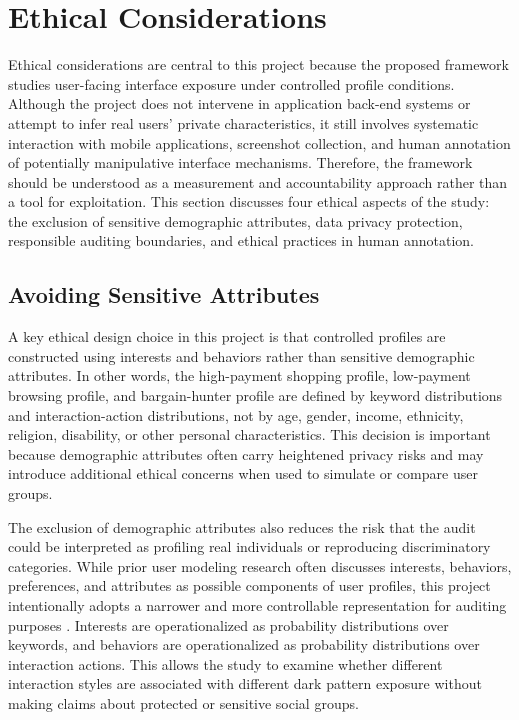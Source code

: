 \chapter{Ethical Considerations}

Ethical considerations are central to this project because the proposed framework studies user-facing interface exposure under controlled profile conditions. Although the project does not intervene in application back-end systems or attempt to infer real users' private characteristics, it still involves systematic interaction with mobile applications, screenshot collection, and human annotation of potentially manipulative interface mechanisms. Therefore, the framework should be understood as a measurement and accountability approach rather than a tool for exploitation. This section discusses four ethical aspects of the study: the exclusion of sensitive demographic attributes, data privacy protection, responsible auditing boundaries, and ethical practices in human annotation.

\section{Avoiding Sensitive Attributes}

A key ethical design choice in this project is that controlled profiles are constructed using interests and behaviors rather than sensitive demographic attributes. In other words, the high-payment shopping profile, low-payment browsing profile, and bargain-hunter profile are defined by keyword distributions and interaction-action distributions, not by age, gender, income, ethnicity, religion, disability, or other personal characteristics. This decision is important because demographic attributes often carry heightened privacy risks and may introduce additional ethical concerns when used to simulate or compare user groups.

The exclusion of demographic attributes also reduces the risk that the audit could be interpreted as profiling real individuals or reproducing discriminatory categories. While prior user modeling research often discusses interests, behaviors, preferences, and attributes as possible components of user profiles, this project intentionally adopts a narrower and more controllable representation for auditing purposes \cite{eke2019userprofiling,purificato2024usermodeling}. Interests are operationalized as probability distributions over keywords, and behaviors are operationalized as probability distributions over interaction actions. This allows the study to examine whether different interaction styles are associated with different dark pattern exposure without making claims about protected or sensitive social groups.


